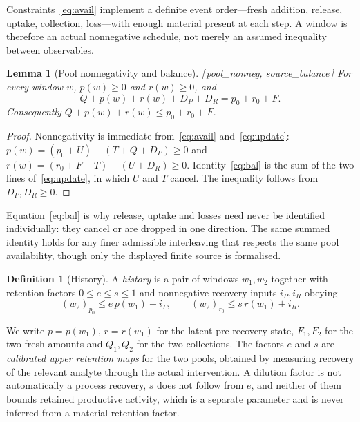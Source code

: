 \documentclass[11pt]{article}
\theoremstyle{plain}
\newtheorem{lemma}[theorem]{Lemma}
\theoremstyle{definition}
\newtheorem{definition}[theorem]{Definition}
\theoremstyle{remark}
\newcommand{\leanref}[1]{{\normalfont\sffamily\footnotesize[\,#1\,]}}
\begin{document}
Constraints~\eqref{eq:avail} implement a definite event order---fresh
addition, release, uptake, collection, loss---with enough material present at
each step. A window is therefore an actual nonnegative schedule, not merely an
assumed inequality between observables.

\begin{lemma}[Pool nonnegativity and balance]\label{lem:balance}
\leanref{pool\_nonneg, source\_balance}
For every window $w$, $p(w)\ge0$ and $r(w)\ge0$, and
\begin{equation}
 Q+p(w)+r(w)+D_P+D_R=p_0+r_0+F .
 \label{eq:bal}
\end{equation}
Consequently $Q+p(w)+r(w)\le p_0+r_0+F$.
\end{lemma}

\begin{proof}
Nonnegativity is immediate from~\eqref{eq:avail} and~\eqref{eq:update}:
$p(w)=(p_0+U)-(T+Q+D_P)\ge0$ and
$r(w)=(r_0+F+T)-(U+D_R)\ge0$. Identity~\eqref{eq:bal} is the sum
of the two lines of~\eqref{eq:update}, in which $U$ and $T$ cancel. The
inequality follows from $D_P,D_R\ge0$.
\end{proof}

Equation~\eqref{eq:bal} is why release, uptake and losses need never be
identified individually: they cancel or are dropped in one direction. The
same summed identity holds for any finer admissible interleaving that
respects the same pool availability, though only the displayed finite source
is formalised.

\begin{definition}[History]\label{def:history}
A \emph{history} is a pair of windows $w_1,w_2$ together with retention
factors $0\le e\le s\le 1$ and nonnegative recovery inputs $i_P,i_R$ obeying
\begin{equation}
 (w_2)_{p_0}\le e\,p(w_1)+i_P,
 \qquad
 (w_2)_{r_0}\le s\,r(w_1)+i_R .
 \label{eq:recovery}
\end{equation}
\end{definition}

We write $p=p(w_1)$, $r=r(w_1)$ for the latent pre-recovery state,
$F_1,F_2$ for the two fresh amounts and $Q_1,Q_2$ for the two collections.
The factors $e$ and $s$ are \emph{calibrated upper retention maps} for the two
pools, obtained by measuring recovery of the relevant analyte through the
actual intervention. A dilution factor is not automatically a process
recovery, $s$ does not follow from $e$, and neither of them bounds retained
productive activity, which is a separate parameter and is never inferred from
a material retention factor.
\end{document}
